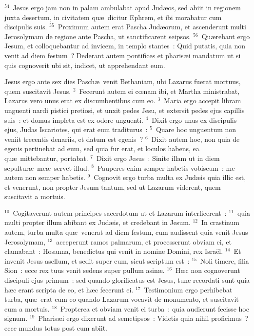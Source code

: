 ${}^{54}$~Jesus ergo jam non in palam ambulabat apud Jud\ae os, sed abiit in regionem juxta desertum, in civitatem qu\ae\ dicitur Ephrem, et ibi morabatur cum discipulis suis.
${}^{55}$~Proximum autem erat Pascha Jud\ae orum, et ascenderunt multi Jerosolymam de regione ante Pascha, ut sanctificarent seipsos.
${}^{56}$~Qu\ae rebant ergo Jesum, et colloquebantur ad invicem, in templo stantes~: Quid putatis, quia non venit ad diem festum~? Dederant autem pontifices et pharis\ae i mandatum ut si quis cognoverit ubi sit, indicet, ut apprehendant eum.

\lettrine[lines=10,image=true,loversize=0.05,lraise=-0.03]{J}{}esus ergo ante sex dies Pasch\ae\ venit Bethaniam, ubi Lazarus fuerat mortuus, quem suscitavit Jesus.
${}^{2}$~Fecerunt autem ei cœnam ibi, et Martha ministrabat, Lazarus vero unus erat ex discumbentibus cum eo.
${}^{3}$~Maria ergo accepit libram unguenti nardi pistici pretiosi, et unxit pedes Jesu, et extersit pedes ejus capillis suis~: et domus impleta est ex odore unguenti.
${}^{4}$~Dixit ergo unus ex discipulis ejus, Judas Iscariotes, qui erat eum traditurus~:
${}^{5}$~Quare hoc unguentum non veniit trecentis denariis, et datum est egenis~?
${}^{6}$~Dixit autem hoc, non quia de egenis pertinebat ad eum, sed quia fur erat, et loculos habens, ea qu\ae\ mittebantur, portabat.
${}^{7}$~Dixit ergo Jesus~: Sinite illam ut in diem sepultur\ae\ me\ae\ servet illud.
${}^{8}$~Pauperes enim semper habetis vobiscum~: me autem non semper habetis.
${}^{9}$~Cognovit ergo turba multa ex Jud\ae is quia illic est, et venerunt, non propter Jesum tantum, sed ut Lazarum viderent, quem suscitavit a mortuis.


${}^{10}$~Cogitaverunt autem principes sacerdotum ut et Lazarum interficerent~:
${}^{11}$~quia multi propter illum abibant ex Jud\ae is, et credebant in Jesum.
${}^{12}$~In crastinum autem, turba multa qu\ae\ venerat ad diem festum, cum audissent quia venit Jesus Jerosolymam,
${}^{13}$~acceperunt ramos palmarum, et processerunt obviam ei, et clamabant~: Hosanna, benedictus qui venit in nomine Domini, rex Isra\"el.
${}^{14}$~Et invenit Jesus asellum, et sedit super eum, sicut scriptum est~:
${}^{15}$~Noli timere, filia Sion~: ecce rex tuus venit sedens super pullum asin\ae .
${}^{16}$~H\ae c non cognoverunt discipuli ejus primum~: sed quando glorificatus est Jesus, tunc recordati sunt quia h\ae c erant scripta de eo, et h\ae c fecerunt ei.
${}^{17}$~Testimonium ergo perhibebat turba, qu\ae\ erat cum eo quando Lazarum vocavit de monumento, et suscitavit eum a mortuis.
${}^{18}$~Propterea et obviam venit ei turba~: quia audierunt fecisse hoc signum.
${}^{19}$~Pharis\ae i ergo dixerunt ad semetipsos~: Videtis quia nihil proficimus~? ecce mundus totus post eum abiit.


